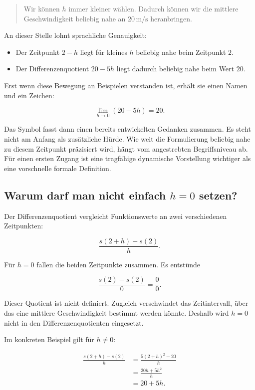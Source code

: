 \documentclass[11pt,a4paper]{article}
\begin{document}
\begin{quote}
Wir können $h$ immer kleiner wählen. Dadurch können wir die mittlere
Geschwindigkeit beliebig nahe an $20\,\mathrm{m/s}$ heranbringen.
\end{quote}

An dieser Stelle lohnt sprachliche Genauigkeit:

\begin{itemize}
  \item Der Zeitpunkt $2-h$ liegt für kleines $h$ beliebig nahe beim Zeitpunkt
        $2$.
  \item Der Differenzenquotient $20-5h$ liegt dadurch beliebig nahe beim Wert
        $20$.
\end{itemize}

Erst wenn diese Bewegung an Beispielen verstanden ist, erhält sie einen Namen
und ein Zeichen:

\[
  \lim_{h\to 0}(20-5h)=20.
\]

Das Symbol fasst dann einen bereits entwickelten Gedanken zusammen. Es steht
nicht am Anfang als zusätzliche Hürde. Wie weit die Formulierung \glqq beliebig
nahe\grqq{} zu diesem Zeitpunkt präzisiert wird, hängt vom angestrebten
Begriffsniveau ab. Für einen ersten Zugang ist eine tragfähige dynamische
Vorstellung wichtiger als eine vorschnelle formale Definition.


\subsection{Warum darf man nicht einfach
\texorpdfstring{$h=0$}{h=0} setzen?}

Der Differenzenquotient vergleicht Funktionswerte an zwei verschiedenen
Zeitpunkten:

\[
  \frac{s(2+h)-s(2)}{h}.
\]

Für $h=0$ fallen die beiden Zeitpunkte zusammen. Es entstünde

\[
  \frac{s(2)-s(2)}{0}=\frac{0}{0}.
\]

Dieser Quotient ist nicht definiert. Zugleich verschwindet das Zeitintervall,
über das eine mittlere Geschwindigkeit bestimmt werden könnte. Deshalb wird
$h=0$ nicht in den Differenzenquotienten eingesetzt.

Im konkreten Beispiel gilt für $h\neq 0$:

\begin{align*}
  \frac{s(2+h)-s(2)}{h}
  &=\frac{5(2+h)^2-20}{h}\\
  &=\frac{20h+5h^2}{h}\\
  &=20+5h.
\end{align*}
\end{document}
